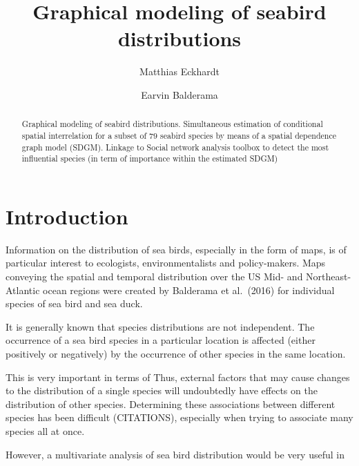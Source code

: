 \documentclass{statsoc}\usepackage[]{graphicx}\usepackage[]{color}
\title[Graphical modeling of seabird distributions]{Graphical modeling of seabird distributions}
\author[Author 1 {\it et al.}]{Matthias Eckhardt}
\author{Earvin Balderama}
\begin{document}



\begin{abstract}
  Graphical modeling of seabird distributions. Simultaneous estimation of conditional spatial interrelation for a subset of $79$ seabird species by means of a spatial dependence graph model (SDGM). Linkage to Social network analysis toolbox to detect the most influential species (in term of importance within the estimated SDGM)  
\end{abstract}




\section{Introduction}


Information on the distribution of sea birds, especially in the form of maps, is of particular interest to ecologists, environmentalists and policy-makers. Maps conveying the spatial and temporal distribution over the US Mid- and Northeast-Atlantic ocean regions were created by Balderama et al.~(2016) for individual species of sea bird and sea duck. 

It is generally known that species distributions are not independent. The occurrence of a sea bird species in a particular location is affected (either positively or negatively) by the occurrence of other species in the same location. 

This is very important in terms of Thus, external factors that may cause changes to the distribution of a single species will undoubtedly have effects on the distribution of other species. Determining these associations between different species has been difficult (CITATIONS), especially when trying to associate many species all at once.

However, a multivariate analysis of sea bird distribution would be very useful in 
\end{document}
